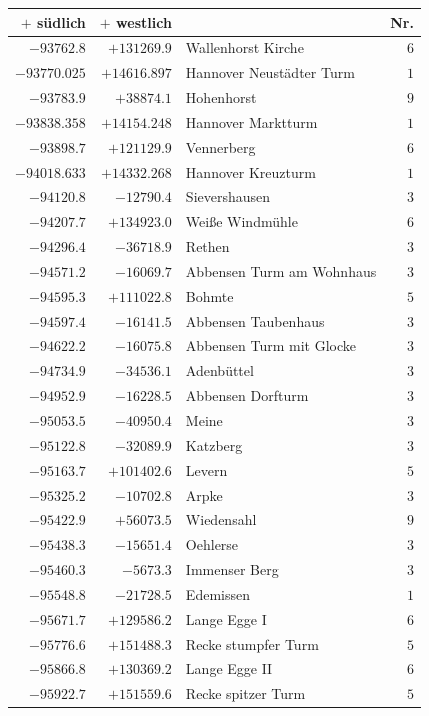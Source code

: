 \begin{center}\begingroup\fontsize{8}{9}\selectfont
\setlength{\tabcolsep}{4pt}
\begin{tabular}{r|r|p{170pt}|r}\hline
\(+\) südlich&\(+\) westlich&&Nr.\\\hline
\(-93762.8\)&\(+131269.9\)&Wallenhorst Kirche&\(6\)\\
\(-93770.025\)&\(+14616.897\)&Hannover Neustädter Turm&\(1\)\\
\(-93783.9\)&\(+38874.1\)&Hohenhorst&\(9\)\\
\(-93838.358\)&\(+14154.248\)&Hannover Marktturm&\(1\)\\
\(-93898.7\)&\(+121129.9\)&Vennerberg&\(6\)\\
\(-94018.633\)&\(+14332.268\)&Hannover Kreuzturm&\(1\)\\
\(-94120.8\)&\(-12790.4\)&Sievershausen&\(3\)\\
\(-94207.7\)&\(+134923.0\)&Weiße Windmühle&\(6\)\\
\(-94296.4\)&\(-36718.9\)&Rethen&\(3\)\\
\(-94571.2\)&\(-16069.7\)&Abbensen Turm am Wohnhaus&\(3\)\\
\(-94595.3\)&\(+111022.8\)&Bohmte&\(5\)\\
\(-94597.4\)&\(-16141.5\)&Abbensen Taubenhaus&\(3\)\\
\(-94622.2\)&\(-16075.8\)&Abbensen Turm mit Glocke&\(3\)\\
\(-94734.9\)&\(-34536.1\)&Adenbüttel&\(3\)\\
\(-94952.9\)&\(-16228.5\)&Abbensen Dorfturm&\(3\)\\
\(-95053.5\)&\(-40950.4\)&Meine&\(3\)\\
\(-95122.8\)&\(-32089.9\)&Katzberg&\(3\)\\
\(-95163.7\)&\(+101402.6\)&Levern&\(5\)\\
\(-95325.2\)&\(-10702.8\)&Arpke&\(3\)\\
\(-95422.9\)&\(+56073.5\)&Wiedensahl&\(9\)\\
\(-95438.3\)&\(-15651.4\)&Oehlerse&\(3\)\\
\(-95460.3\)&\(-5673.3\)&Immenser Berg&\(3\)\\
\(-95548.8\)&\(-21728.5\)&Edemissen&\(1\)\\
\(-95671.7\)&\(+129586.2\)&Lange Egge I&\(6\)\\
\(-95776.6\)&\(+151488.3\)&Recke stumpfer Turm&\(5\)\\
\(-95866.8\)&\(+130369.2\)&Lange Egge II&\(6\)\\
\(-95922.7\)&\(+151559.6\)&Recke spitzer Turm&\(5\)\\

\end{tabular}
\end{center}
